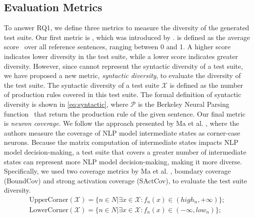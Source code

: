 \subsection{Evaluation Metrics}
\label{sec:metric}
To answer RQ1, we define three metrics to measure the diversity of the generated test suite. Our first metric is \textit{\selfbleu}, which was introduced by \cite{zhu2018texygen}. \selfbleu is defined as the average \bleu score~\cite{papineni2002bleu} over all reference sentences, ranging between 0 and 1. A higher \selfbleu score indicates lower diversity in the test suite, while a lower score indicates greater diversity.
However, since \selfbleu cannot represent the syntactic diversity of a test suite, we have proposed a new metric, \textit{syntactic diversity}, to evaluate the diversity of the test suite. The syntactic diversity of a test suite $\mathcal{X}$ is defined as the number of production rules covered in this test suite. The formal definition of syntactic diversity is shown in  \eqref{eq:syntactic}, where $\mathcal{P}$ is the Berkeley Neural Parsing function~\cite{kitaev2018seedparser,kitaev2019seedparser} that return the production rule of the given sentence.
Our final metric is \textit{neuron coverage}. 
We follow the approach presented by Ma et al. \cite{ma2018deepgauge}, where the authors measure the coverage of NLP model intermediate states as corner-case neurons.
Because the matrix computation of intermediate states impacts NLP model decision-making, a test suite that covers a greater number of intermediate states can represent more NLP model decision-making, making it more diverse.
Specifically, we used two coverage metrics by Ma et al. \cite{ma2018deepgauge}, boundary coverage (BoundCov) and strong activation coverage (SActCov), to evaluate the test suite diversity.
\begin{equation}
\begin{split}
    \text{UpperCorner}(\mathcal{X}) = \{n \in N | \exists x \in \mathcal{X}: f_n(x) \in (high_n, +\infty)\}; \\
    \text{LowerCorner}(\mathcal{X}) = \{n \in N | \exists x \in \mathcal{X}: f_n(x) \in (-\infty, low_n)\}; \\
\end{split}
    \label{eq:corner}
\end{equation}

